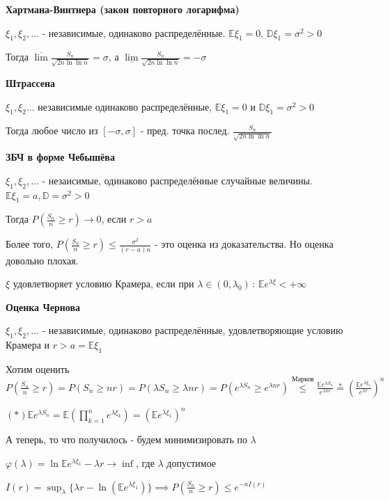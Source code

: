 \begin{theorem}
    \textbf{Хартмана-Винтнера (закон повторного логарифма)}

    $\xi_1, \xi_2, \ldots$ - независимые, одинаково распределённые. $\mathbb{E} \xi_1 = 0, \, \mathbb{D} \xi_1 = \sigma^2 > 0$

    Тогда $\overline{\lim} \frac{S_n}{\sqrt{2n \ln \ln n}} = \sigma$, а $\underline{\lim} \frac{S_n}{\sqrt{2n \ln \ln n}} = -\sigma$
\end{theorem}

\begin{theorem}
    \textbf{Штрассена}

    $\xi_1, \xi_2 \ldots$ независимые одинаково распределённые, $\mathbb{E} \xi_1 = 0$ и $\mathbb{D} \xi_1 = \sigma^2 > 0$

    Тогда любое число из $[-\sigma, \sigma]$ - пред. точка послед. $\frac{S_n}{\sqrt{2n \ln \ln n}}$
\end{theorem}



 \textbf{ЗБЧ в форме Чебышёва}

 $\xi_1, \xi_2, \ldots$ - незаисимые, одинаково распределённые случайные величины. $\mathbb{E} \xi_1 = a, \mathbb{D} = \sigma^2 > 0$

 Тогда $P\left(\frac{S_n}{n} \geqslant r \right) \rightarrow 0$, если $r > a$

 Более того, $P \left( \frac{S_n}{n} \geqslant r \right) \leqslant \frac{\sigma^2}{(r - a)n}$ - это оценка из доказательства. Но оценка довольно плохая.

 \begin{definition}
    $\xi$ удовлетворяет условию Крамера, если при $\lambda \in (0, \lambda_0)\, : \, \mathbb{E} e^{\lambda \xi} < +\infty$
 \end{definition}

 \begin{theorem}

    \textbf{Оценка Чернова}

    $\xi_1, \xi_2, \ldots$ - независимые, одинаково распределённые, удовлетворяющие условию Крамера и $r > a = \mathbb{E}\xi_1$

    Хотим оценить $P\left( \frac{S_n}{n} \geqslant r \right) = P\left( S_n \geqslant nr \right) = P\left( \lambda S_n \geqslant \lambda nr \right) = P\left( e^{ \lambda S_n} \geqslant e^{\lambda nr} \right) \overset{\text{Марков}}{\leqslant} \frac{\mathbb{E} e^{\lambda S_n}}{e^{\lambda n r}}
    \overset{*}{=} \left( \frac{\mathbb{E} e^{\lambda \xi_1}}{e^{\lambda r}}  \right)^n$

    $(*) \mathbb{E} e^{\lambda S_n} = \mathbb{E} (\prod_{k = 1}^n e^{\lambda \xi_k}) = (\mathbb{E} e^{\lambda \xi_1})^n$

    А теперь, то что получилось - будем минимизировать по $\lambda$

    $\varphi (\lambda) = \ln \mathbb{E} e^{\lambda \xi_1} - \lambda r \rightarrow \inf$, где $\lambda$ допустимое

    $I(r) = \sup_{\lambda} \{ \lambda r - \ln (\mathbb{E} e^{\lambda \xi_1}) \} \implies P \left( \frac{S_n}{n} \geqslant r \right) \leqslant e^{-n I(r)}$
 \end{theorem}


